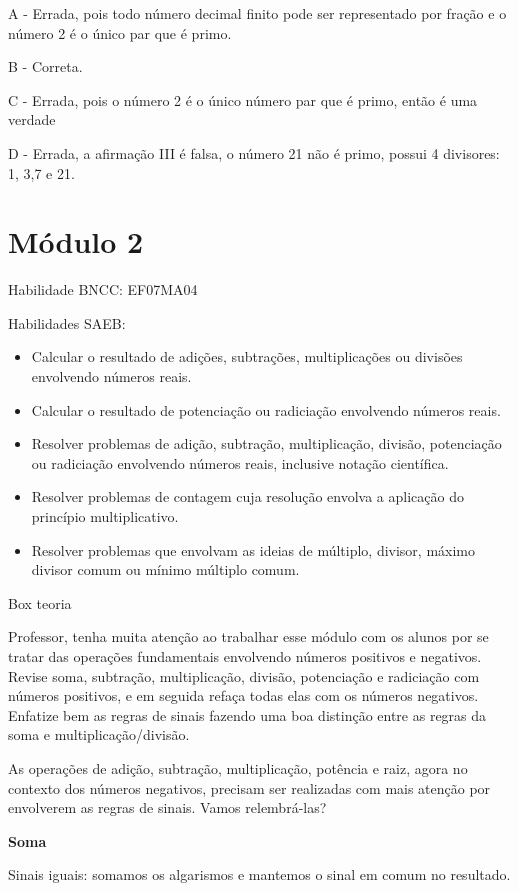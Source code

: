 {A - Errada, pois todo número decimal finito pode ser representado por
fração e o número 2 é o único par que é primo.

B - Correta.

C - Errada, pois o número 2 é o único número par que é primo, então é
uma verdade

D - Errada, a afirmação III é falsa, o número 21 não é primo, possui 4
divisores: 1, 3,7 e 21.

\hypertarget{muxf3dulo-2}{%
\section{Módulo 2}

Habilidade BNCC: EF07MA04

Habilidades SAEB:

\begin{itemize}
\item
  Calcular o resultado de adições, subtrações, multiplicações ou
  divisões envolvendo números reais.
\item
  Calcular o resultado de potenciação ou radiciação envolvendo números
  reais.
\item
  Resolver problemas de adição, subtração, multiplicação, divisão,
  potenciação ou radiciação envolvendo números reais, inclusive notação
  científica.
\item
  Resolver problemas de contagem cuja resolução envolva a aplicação do
  princípio multiplicativo.
\item
  Resolver problemas que envolvam as ideias de múltiplo, divisor, máximo
  divisor comum ou mínimo múltiplo comum.
\end{itemize}

Box teoria

Professor, tenha muita atenção ao trabalhar esse módulo com os alunos
por se tratar das operações fundamentais envolvendo números positivos e
negativos. Revise soma, subtração, multiplicação, divisão, potenciação e
radiciação com números positivos, e em seguida refaça todas elas com os
números negativos. Enfatize bem as regras de sinais fazendo uma boa
distinção entre as regras da soma e multiplicação/divisão.

As operações de adição, subtração, multiplicação, potência e raiz, agora
no contexto dos números negativos, precisam ser realizadas com mais
atenção por envolverem as regras de sinais. Vamos relembrá-las?

\textbf{Soma}

Sinais iguais: somamos os algarismos e mantemos o sinal em comum no
resultado.

}}
